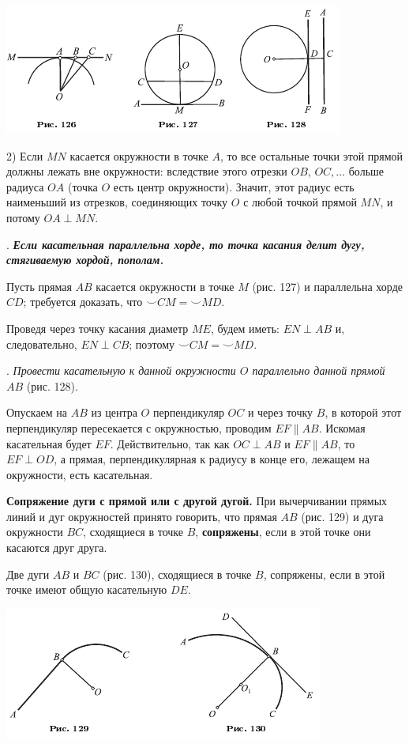 \documentclass[oneside]{book}
\begin{document}
\includegraphics{pics/ris-126-128}

2) Если $MN$ касается окружности в точке $A$, то все остальные точки этой прямой должны лежать вне окружности:
вследствие этого отрезки $OB$, $OC,\dots$
больше радиуса $OA$ (точка $O$ есть центр окружности).
Значит, этот радиус есть наименьший из отрезков, соединяющих точку $O$ с любой точкой прямой $MN$, и потому $OA\perp MN$.

.
\textbf{\emph{Если касательная параллельна хорде, то точка касания делит дугу, стягиваемую хордой, пополам.}}

Пусть прямая $AB$ касается окружности в точке $M$ (рис. 127) и параллельна хорде $CD$;
требуется доказать, что ${\smallsmile}CM={\smallsmile}MD$.

Проведя через точку касания диаметр $ME$, будем иметь:
$EN\perp AB$ и, следовательно, $EN\perp CB$;
поэтому ${\smallsmile}CM={\smallsmile}MD$.

.
\emph{Провести касательную к данной окружности $O$ параллельно данной прямой $AB$} (рис. 128).

Опускаем на $AB$ из центра $O$ перпендикуляр $OC$ и через точку $B$, в которой этот перпендикуляр пересекается с окружностью, проводим $EF\parallel AB$.
Искомая касательная будет $EF$.
Действительно, так как $OC\perp AB$ и $EF\parallel AB$, то $EF\perp OD$, а прямая, перпендикулярная к радиусу в конце его, лежащем на окружности, есть касательная.

\textbf{Сопряжение дуги с прямой или с другой дугой.}
При вычерчивании прямых линий и дуг окружностей принято говорить, что прямая $AB$ (рис. 129) и дуга окружности $BC$, сходящиеся в точке $B$, \textbf{сопряжены}, если в этой точке они касаются друг друга.

Две дуги $AB$ и $BC$ (рис. 130), сходящиеся в точке $B$, сопряжены, если в этой точке имеют общую касательную $DE$.

\includegraphics{pics/ris-129-130}
\end{document}
